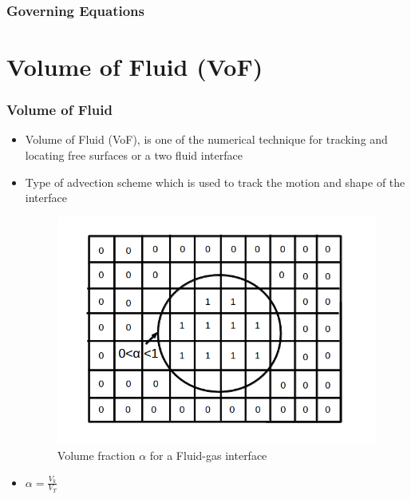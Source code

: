 \documentclass{beamer}
\begin{document}

\begin{frame} %
\frametitle{Governing Equations}

\end{frame}


\section{Volume of Fluid (VoF)}
\begin{frame}
\frametitle{Volume of Fluid}
\begin{itemize}
  \item Volume of Fluid (VoF), is one of the numerical technique for tracking and locating free surfaces or a two fluid interface
  \item Type of advection scheme which is used to track the motion and shape of the interface
  \begin{figure}[h]  
  \begin{center}  
  \includegraphics[scale=0.25]{5.png}
  \caption{\tiny{Volume fraction $\alpha$ for a Fluid-gas interface}}
  \end{center}  
  \end{figure}
  \item $\alpha = \frac{V_{k}}{V_{T}}$
\end{itemize}

\end{frame}
\end{document}
